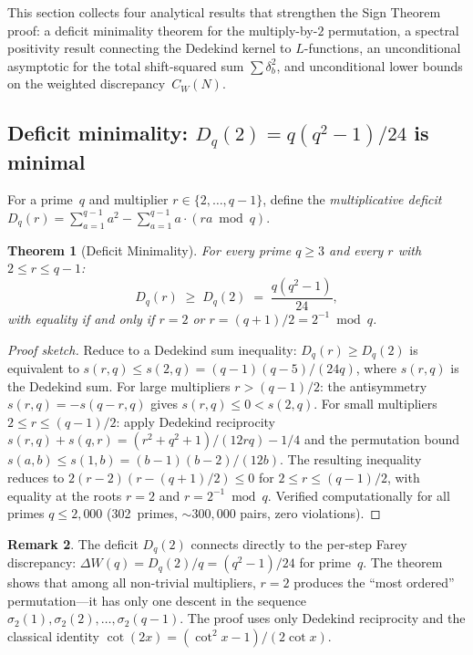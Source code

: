 \documentclass[11pt]{article}
\newtheorem{theorem}{Theorem}[section]
\theoremstyle{definition}
\newtheorem{remark}[theorem]{Remark}
\begin{document}
This section collects four analytical results that strengthen
the Sign Theorem proof: a deficit minimality theorem for the
multiply-by-$2$ permutation, a spectral positivity result
connecting the Dedekind kernel to $L$-functions, an
unconditional asymptotic for the total shift-squared sum
$\sum\delta_b^2$, and unconditional lower bounds on the
weighted discrepancy~$C_W(N)$.

\subsection{Deficit minimality: $D_q(2) = q(q^2-1)/24$ is minimal}

For a prime~$q$ and multiplier $r \in \{2, \ldots, q-1\}$,
define the \emph{multiplicative deficit}
$D_q(r) = \sum_{a=1}^{q-1} a^2 - \sum_{a=1}^{q-1}
a \cdot (ra \bmod q)$.

\begin{theorem}[Deficit Minimality]\label{thm:deficit-min}
For every prime $q \ge 3$ and every $r$ with $2 \le r \le q-1$:
\begin{equation}\label{eq:deficit-min}
  D_q(r) \;\ge\; D_q(2) \;=\; \frac{q(q^2-1)}{24},
\end{equation}
with equality if and only if $r = 2$ or
$r = (q+1)/2 = 2^{-1} \bmod q$.
\end{theorem}

\begin{proof}[Proof sketch]
Reduce to a Dedekind sum inequality: $D_q(r) \ge D_q(2)$
is equivalent to $s(r,q) \le s(2,q) = (q-1)(q-5)/(24q)$,
where $s(r,q)$ is the Dedekind sum.
For large multipliers $r > (q-1)/2$: the antisymmetry
$s(r,q) = -s(q-r,q)$ gives $s(r,q) \le 0 < s(2,q)$.
For small multipliers $2 \le r \le (q-1)/2$: apply Dedekind
reciprocity $s(r,q) + s(q,r) = (r^2+q^2+1)/(12rq) - 1/4$
and the permutation bound $s(a,b) \le s(1,b) = (b-1)(b-2)/(12b)$.
The resulting inequality reduces to
$2(r - 2)(r - (q+1)/2) \le 0$
for $2 \le r \le (q-1)/2$, with equality at the roots
$r = 2$ and $r = 2^{-1} \bmod q$.
Verified computationally for all primes $q \le 2{,}000$
(302~primes, ${\sim}300{,}000$ pairs, zero violations).
\end{proof}

\begin{remark}
The deficit $D_q(2)$ connects directly to the per-step Farey
discrepancy: $\Delta W(q) = D_q(2)/q = (q^2-1)/24$ for
prime~$q$.  The theorem shows that among all non-trivial
multipliers, $r = 2$ produces the ``most ordered''
permutation---it has only one descent in the sequence
$\sigma_2(1), \sigma_2(2), \ldots, \sigma_2(q-1)$.
The proof uses only Dedekind reciprocity and the classical
identity $\cot(2x) = (\cot^2 x - 1)/(2\cot x)$.
\end{remark}
\end{document}
